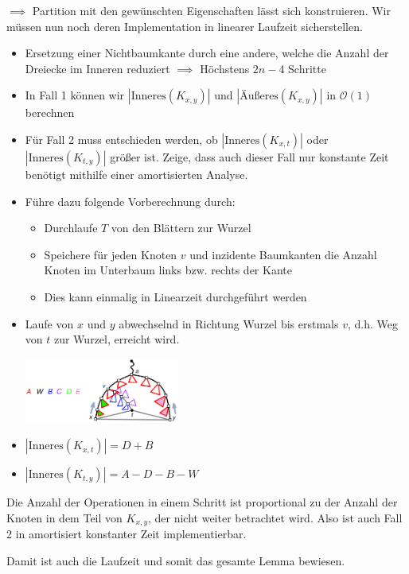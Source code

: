 $\implies$ Partition mit den gewünschten Eigenschaften lässt sich konstruieren. Wir müssen nun noch deren Implementation in linearer Laufzeit sicherstellen.

\begin{itemize}
	\item Ersetzung einer Nichtbaumkante durch eine andere, welche die Anzahl der Dreiecke im Inneren reduziert $\implies$ Höchstens $2n-4$ Schritte
	\item In Fall 1 können wir $|\text{Inneres}(K_{x,y})|$ und $|\text{Äußeres}(K_{x,y})|$ in $\mathcal{O}(1)$ berechnen
	\item Für Fall 2 muss entschieden werden, ob $|\text{Inneres}(K_{x,t})|$ oder $|\text{Inneres}(K_{t,y})|$ größer ist. Zeige, dass auch dieser Fall nur konstante Zeit benötigt mithilfe einer amortisierten Analyse.
	\item Führe dazu folgende Vorberechnung durch:
	\begin{itemize}
		\item Durchlaufe $T$ von den Blättern zur Wurzel
		\item Speichere für jeden Knoten $v$ und inzidente Baumkanten die Anzahl Knoten im Unterbaum links bzw. rechts der Kante
		\item Dies kann einmalig in Linearzeit durchgeführt werden
	\end{itemize}
	\item Laufe von $x$ und $y$ abwechselnd in Richtung Wurzel bis erstmals $v$, d.h. Weg von $t$ zur Wurzel, erreicht wird.
	\begin{center}
		\includegraphics[width=0.4\textwidth]{images/pst-6.png}
	\end{center}
	\item $|\text{Inneres}(K_{x,t})|=D+B$
	\item $|\text{Inneres}(K_{t,y})|=A-D-B-W$
\end{itemize}
\bigskip
Die Anzahl der Operationen in einem Schritt ist proportional zu der Anzahl der Knoten in dem Teil von $K_{x,y}$, der nicht weiter betrachtet wird. Also ist auch Fall 2 in amortisiert konstanter Zeit implementierbar.

Damit ist auch die Laufzeit und somit das gesamte Lemma bewiesen.\\

